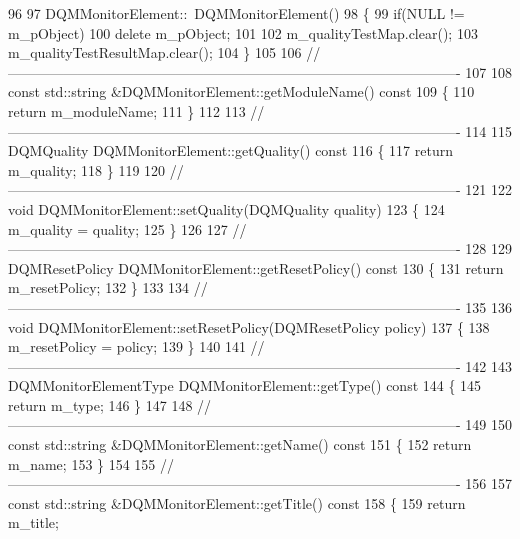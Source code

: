 \begin{DoxyCode}
96 
97 DQMMonitorElement::~DQMMonitorElement()
98 \{
99   \textcolor{keywordflow}{if}(NULL != m\_pObject)
100     \textcolor{keyword}{delete} m\_pObject;
101 
102   m\_qualityTestMap.clear();
103   m\_qualityTestResultMap.clear();
104 \}
105 
106 \textcolor{comment}{//-------------------------------------------------------------------------------------------------}
107 
108 \textcolor{keyword}{const} std::string &DQMMonitorElement::getModuleName()\textcolor{keyword}{ const}
109 \textcolor{keyword}{}\{
110   \textcolor{keywordflow}{return} m\_moduleName;
111 \}
112 
113 \textcolor{comment}{//-------------------------------------------------------------------------------------------------}
114 
115 DQMQuality DQMMonitorElement::getQuality()\textcolor{keyword}{ const}
116 \textcolor{keyword}{}\{
117   \textcolor{keywordflow}{return} m\_quality;
118 \}
119 
120 \textcolor{comment}{//-------------------------------------------------------------------------------------------------}
121 
122 \textcolor{keywordtype}{void} DQMMonitorElement::setQuality(DQMQuality quality)
123 \{
124   m\_quality = quality;
125 \}
126 
127 \textcolor{comment}{//-------------------------------------------------------------------------------------------------}
128 
129 DQMResetPolicy DQMMonitorElement::getResetPolicy()\textcolor{keyword}{ const}
130 \textcolor{keyword}{}\{
131   \textcolor{keywordflow}{return} m\_resetPolicy;
132 \}
133 
134 \textcolor{comment}{//-------------------------------------------------------------------------------------------------}
135 
136 \textcolor{keywordtype}{void} DQMMonitorElement::setResetPolicy(DQMResetPolicy policy)
137 \{
138   m\_resetPolicy = policy;
139 \}
140 
141 \textcolor{comment}{//-------------------------------------------------------------------------------------------------}
142 
143 DQMMonitorElementType DQMMonitorElement::getType()\textcolor{keyword}{ const}
144 \textcolor{keyword}{}\{
145   \textcolor{keywordflow}{return} m\_type;
146 \}
147 
148 \textcolor{comment}{//-------------------------------------------------------------------------------------------------}
149 
150 \textcolor{keyword}{const} std::string &DQMMonitorElement::getName()\textcolor{keyword}{ const}
151 \textcolor{keyword}{}\{
152   \textcolor{keywordflow}{return} m\_name;
153 \}
154 
155 \textcolor{comment}{//-------------------------------------------------------------------------------------------------}
156 
157 \textcolor{keyword}{const} std::string &DQMMonitorElement::getTitle()\textcolor{keyword}{ const}
158 \textcolor{keyword}{}\{
159   \textcolor{keywordflow}{return} m\_title;

\end{DoxyCode}
